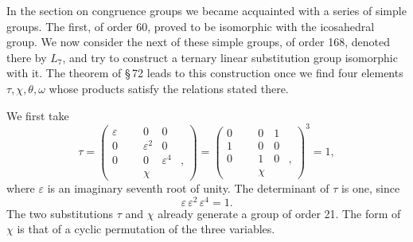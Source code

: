 \documentclass[11pt]{article}
\providecommand{\eps}{\varepsilon}
\providecommand{\eps}{\varepsilon}
\providecommand{\mat}[4]{\begin{pmatrix}#1&#2\\#3&#4\end{pmatrix}}
\providecommand{\mat}[4]{\begin{pmatrix}#1&#2\\#3&#4\end{pmatrix}}
\providecommand{\mat}[1]{\begin{pmatrix}#1\end{pmatrix}}
\begin{document}
In the section on congruence groups we became acquainted with a series of simple groups. The first, of order 60, proved to be isomorphic with the icosahedral group. We now consider the next of these simple groups, of order 168, denoted there by \(L_7\), and try to construct a ternary linear substitution group isomorphic with it. The theorem of \S\,72 leads to this construction once we find four elements \(\tau,\chi,\theta,\omega\) whose products satisfy the relations stated there.

We first take
\begin{equation}
\tau=\mat{\eps&0&0\\0&\eps^2&0\\0&0&\eps^4},
\qquad
\chi=\mat{0&0&1\\1&0&0\\0&1&0},
\qquad \chi^3=1,
\tag{1}
\end{equation}
where \(\eps\) is an imaginary seventh root of unity. The determinant of \(\tau\) is one, since
\begin{equation}
\eps\,\eps^2\,\eps^4=1.
\tag{2}
\end{equation}
The two substitutions \(\tau\) and \(\chi\) already generate a group of order 21. The form of \(\chi\) is that of a cyclic permutation of the three variables.
\end{document}
